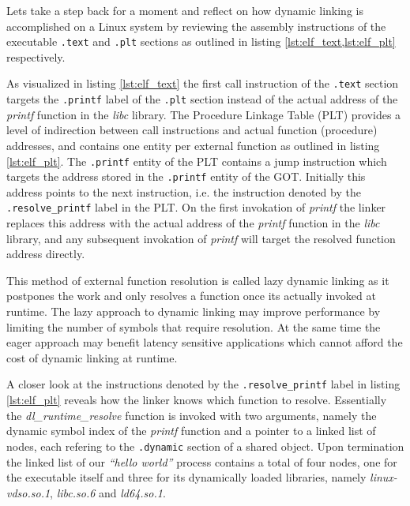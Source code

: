 Lets take a step back for a moment and reflect on how dynamic linking is accomplished on a Linux system by reviewing the assembly instructions of the executable \texttt{.text} and \texttt{.plt} sections as outlined in listing \ref{lst:elf_text,lst:elf_plt} respectively.





As visualized in listing \ref{lst:elf_text} the first call instruction of the \texttt{.text} section targets the \texttt{.printf} label of the \texttt{.plt} section instead of the actual address of the \textit{printf} function in the \textit{libc} library. The Procedure Linkage Table (PLT) provides a level of indirection between call instructions and actual function (procedure) addresses, and contains one entity per external function as outlined in listing \ref{lst:elf_plt}. The \texttt{.printf} entity of the PLT contains a jump instruction which targets the address stored in the \texttt{.printf} entity of the GOT. Initially this address points to the next instruction, i.e. the instruction denoted by the \texttt{.resolve\_printf} label in the PLT. On the first invokation of \textit{printf} the linker replaces this address with the actual address of the \textit{printf} function in the \textit{libc} library, and any subsequent invokation of \textit{printf} will target the resolved function address directly.

This method of external function resolution is called lazy dynamic linking as it postpones the work and only resolves a function once its actually invoked at runtime. The lazy approach to dynamic linking may improve performance by limiting the number of symbols that require resolution. At the same time the eager approach may benefit latency sensitive applications which cannot afford the cost of dynamic linking at runtime.

A closer look at the instructions denoted by the \texttt{.resolve\_printf} label in listing \ref{lst:elf_plt} reveals how the linker knows which function to resolve. Essentially the \textit{dl\_runtime\_resolve} function is invoked with two arguments, namely the dynamic symbol index of the \textit{printf} function and a pointer to a linked list of nodes, each refering to the \texttt{.dynamic} section of a shared object. Upon termination the linked list of our \textit{``hello world''} process contains a total of four nodes, one for the executable itself and three for its dynamically loaded libraries, namely \textit{linux-vdso.so.1}, \textit{libc.so.6} and \textit{ld64.so.1}.

